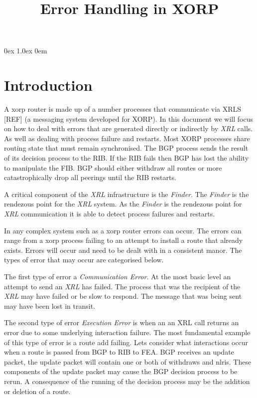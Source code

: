 \documentclass[11pt]{article}
\title{Error Handling in XORP}
\makeatletter
\newcommand{\finder} {{\em Finder}\@\xspace}
\newcommand{\xrl} {{\em XRL}\@\xspace}
\makeatother
\begin{document}
\parsep 0ex
\parskip 1.0ex
\parindent 0em
\noindent
\maketitle                            
\section{Introduction}

A xorp router is made up of a number processes that communicate via
XRLS [REF] (a messaging system developed for XORP). In this document
we will focus on how to deal with errors that are generated directly
or indirectly by \xrl calls. As well as dealing with process failure
and restarts. Most XORP processes share routing state that must remain
synchronised. The BGP process sends the result of its decision process
to the RIB. If the RIB fails then BGP has lost the ability to
manipulate the FIB. BGP should either withdraw all routes or more
catastrophically drop all peerings until the RIB restarts.

A critical component of the \xrl infrastructure is the \finder. The
\finder is the rendezous point for the \xrl system.  As the \finder is
the rendezous point for \xrl communication it is able to detect
process failures and restarts.

In any complex system such as a xorp router errors can occur. The
errors can range from a xorp process failing to an attempt to install
a route that already exists. Errors will occur and need to be dealt
with in a consistent manor. The types of error that may occur are
categorised below.

The first type of error a {\em Communication Error}. At the most basic
level an attempt to send an \xrl has failed. The process that was the
recipient of the \xrl may have failed or be slow to respond. The
message that was being sent may have been lost in transit.

The second type of error {\em Execution Error} is when an an XRL call
returns an error due to some underlying interaction failure. The most
fundamental example of this type of error is a route add failing. Lets
consider what interactions occur when a route is passed from BGP to
RIB to FEA. BGP receives an update packet, the update packet will
contain one or both of withdraws and nlris. These components of the
update packet may cause the BGP decision process to be rerun. A
consequence of the running of the decision process may be the addition
or deletion of a route.
\end{document}
